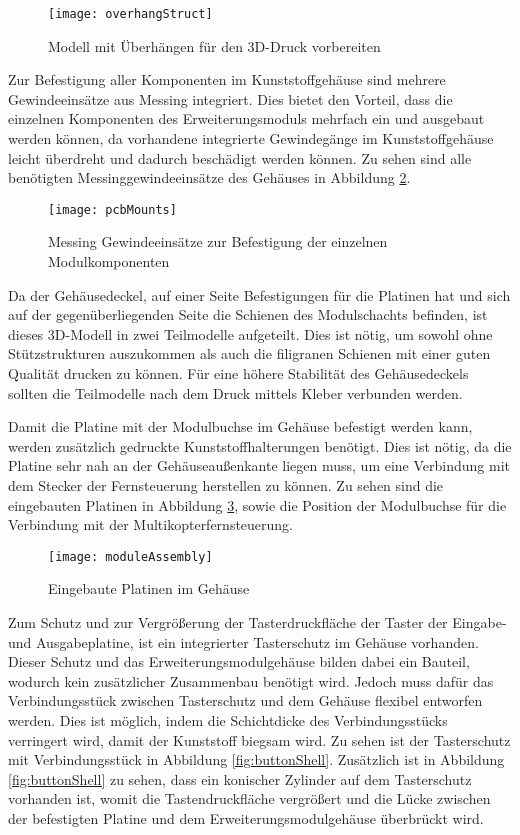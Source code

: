 \begin{figure}[h]
    \centering
    \texttt{[image: overhangStruct]}
    \caption{Modell mit Überhängen für den 3D-Druck vorbereiten}
    \label{fig:overhangStruct}
\end{figure}

Zur Befestigung aller Komponenten im Kunststoffgehäuse sind mehrere Gewindeeinsätze aus Messing integriert. Dies bietet den Vorteil, dass die einzelnen Komponenten des Erweiterungsmoduls mehrfach ein und ausgebaut werden können, da vorhandene integrierte Gewindegänge im Kunststoffgehäuse leicht überdreht und dadurch beschädigt werden können. Zu sehen sind alle benötigten Messinggewindeeinsätze des Gehäuses in Abbildung \ref{fig:pcbMounts}.

\begin{figure}[h]
    \centering
    \texttt{[image: pcbMounts]}
    \caption{Messing Gewindeeinsätze zur Befestigung der einzelnen Modulkomponenten}
    \label{fig:pcbMounts}
\end{figure}

Da der Gehäusedeckel, auf einer Seite Befestigungen für die Platinen hat und sich auf der gegenüberliegenden Seite die Schienen des Modulschachts befinden, ist dieses 3D-Modell in zwei Teilmodelle aufgeteilt. Dies ist nötig, um sowohl ohne Stützstrukturen auszukommen als auch die filigranen Schienen mit einer guten Qualität drucken zu können. Für eine höhere Stabilität des Gehäusedeckels sollten die Teilmodelle nach dem Druck mittels Kleber verbunden werden.

Damit die Platine mit der Modulbuchse im Gehäuse befestigt werden kann, werden zusätzlich gedruckte Kunststoffhalterungen benötigt. Dies ist nötig, da die Platine sehr nah an der Gehäuseaußenkante liegen muss, um eine Verbindung mit dem Stecker der Fernsteuerung herstellen zu können. Zu sehen sind die eingebauten Platinen in Abbildung \ref{fig:moduleAssembly}, sowie die Position der Modulbuchse für die Verbindung mit der Multikopterfernsteuerung.

\begin{figure}[h]
    \centering
    \texttt{[image: moduleAssembly]}
    \caption{Eingebaute Platinen im Gehäuse}
    \label{fig:moduleAssembly}
\end{figure}

Zum Schutz und zur Vergrößerung der Tasterdruckfläche der Taster der Eingabe- und Ausgabeplatine, ist ein integrierter Tasterschutz im Gehäuse vorhanden. Dieser Schutz und das Erweiterungsmodulgehäuse bilden dabei ein Bauteil, wodurch kein zusätzlicher Zusammenbau benötigt wird. Jedoch muss dafür das Verbindungsstück zwischen Tasterschutz und dem Gehäuse flexibel entworfen werden. Dies ist möglich, indem die Schichtdicke des Verbindungsstücks verringert wird, damit der Kunststoff biegsam wird. Zu sehen ist der Tasterschutz mit Verbindungsstück in Abbildung \ref{fig:buttonShell}. Zusätzlich ist in Abbildung \ref{fig:buttonShell} zu sehen, dass ein konischer Zylinder auf dem Tasterschutz vorhanden ist, womit die Tastendruckfläche vergrößert und die Lücke zwischen der befestigten Platine und dem Erweiterungsmodulgehäuse überbrückt wird.

